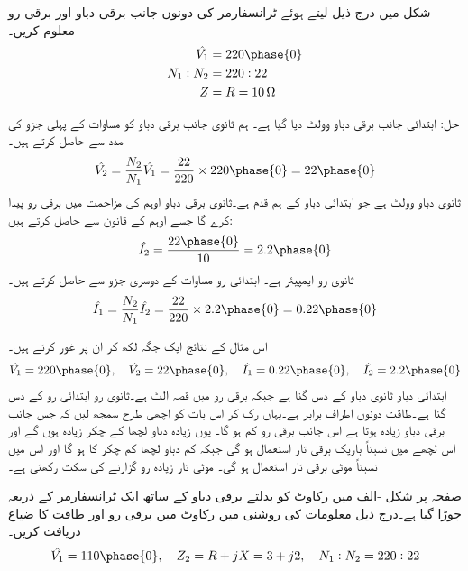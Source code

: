 شکل    میں درج ذیل لیتے ہوئے ٹرانسفارمر کی دونوں جانب برقی دباو اور برقی رو معلوم کریں۔
\begin{align*}
\hat{V_1}&=220 \phase{0}\\
N_1:N_2&=220:22\\
Z&=R=\SI{10}{\ohm}
\end{align*}


حل:\quad 
ابتدائی جانب برقی دباو   وولٹ دیا گیا ہے۔ ہم  ثانوی جانب برقی دباو کو مساوات  کے پہلی جزو کی مدد سے حاصل کرتے ہیں۔
\begin{align*}
\hat{V_2}=\frac{N_2}{N_1} \hat{V_1}=\frac{22}{220} \times 220\phase {0}=22\phase{0}
\end{align*}
ثانوی دباو  وولٹ ہے جو ابتدائی  دباو کے ہم قدم ہے۔ثانوی برقی دباو  اوہم کی مزاحمت میں برقی رو پیدا کرے گا جسے اوہم کے قانون سے حاصل کرتے ہیں:
\begin{align*}
\hat{I_2}=\frac{22 \phase {0}}{10}=2.2\phase {0}
\end{align*}
ثانوی رو  ایمپیئر  ہے۔ ابتدائی رو مساوات  کے دوسری جزو سے حاصل کرتے ہیں۔
\begin{align*}
\hat{I_1}=\frac{N_2}{N_1} \hat{I_2}=\frac{22}{220} \times 2.2\phase{0}=0.22\phase{0}
\end{align*}

اس مثال کے نتائج ایک جگہ لکھ کر ان پر غور کرتے ہیں۔
\begin{align*}
\hat{V_1}=220\phase{0}, \quad \hat{V_2}=22\phase{0}, \quad \hat{I_1}=0.22\phase{0}, \quad \hat{I_2}=2.2\phase{0}
\end{align*}
ابتدائی دباو ثانوی  دباو کے دس گنا ہے جبکہ برقی رو میں قصہ الٹ ہے۔ثانوی رو ابتدائی رو کے دس گنا ہے۔طاقت دونوں اطراف  برابر ہے۔یہاں رک کر  اس بات کو اچھی طرح سمجھ لیں کہ جس جانب برقی دباو زیادہ ہوتا ہے اس جانب برقی رو کم ہو گا۔ یوں زیادہ دباو  لچھا کے چکر زیادہ ہوں گے اور اس لچھے میں نسبتاً باریک برقی تار استعمال ہو گی جبکہ کم  دباو لچھا کم چکر کا ہو گا اور اس میں نسبتاً موٹی برقی تار استعمال ہو گی۔ موٹی تار زیادہ رو گزارنے  کی سکت رکھتی ہے۔ 


صفحہ  پر شکل -الف  میں رکاوٹ  کو  بدلتے برقی دباو  کے ساتھ ایک ٹرانسفارمر کے ذریعہ جوڑا گیا ہے۔درج ذیل معلومات کی روشنی میں رکاوٹ میں برقی رو اور طاقت کا ضیاع دریافت کریں۔
\begin{align*}
\hat{V_1}=110\phase{0},\quad Z_2=R+j X=3+j 2,\quad N_1:N_2=220:22 
\end{align*}

